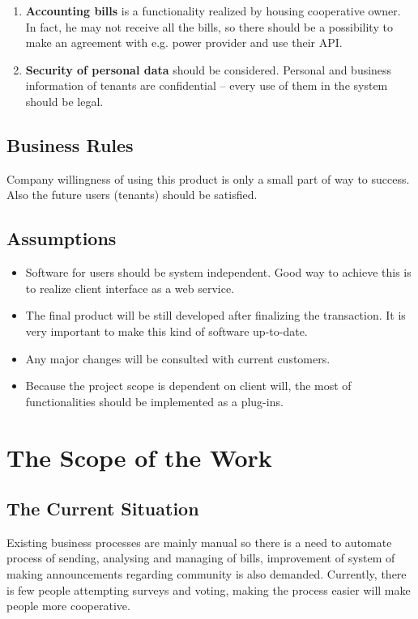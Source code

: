 \documentclass[a4paper,10pt]{report}
\begin{document}
\begin{enumerate}
\item \textbf{Accounting bills} is a functionality realized by housing cooperative owner. In fact, he may not receive all the bills, so there should be a possibility to make an agreement with e.g. power provider and use their API.
\item \textbf{Security of personal data} should be considered. Personal and business information of tenants are confidential – every use of them in the system should be legal.
\end{enumerate}

\subsection{Business Rules}

Company willingness of using this product is only a small part of way to success. Also the future users (tenants) should be satisfied.

\subsection{Assumptions}

\begin{itemize}
\item  Software for users should be system independent. Good way to achieve this is to realize client interface as a web service.
\item The final product will be still developed after finalizing the transaction. It is very important to make this kind of software up-to-date.
\item Any major changes will be consulted with current customers.
\item Because the project scope is dependent on client will, the most of functionalities should be implemented as a plug-ins.


\end{itemize}

\section{The Scope of the Work}
\subsection{The Current Situation}

Existing business processes are mainly manual so there is a need 
to automate process of sending, analysing and managing of bills, 
improvement of system of making announcements regarding community is 
also demanded. Currently, there is few people attempting surveys and 
voting, making the process easier will make people more cooperative.
\end{document}

